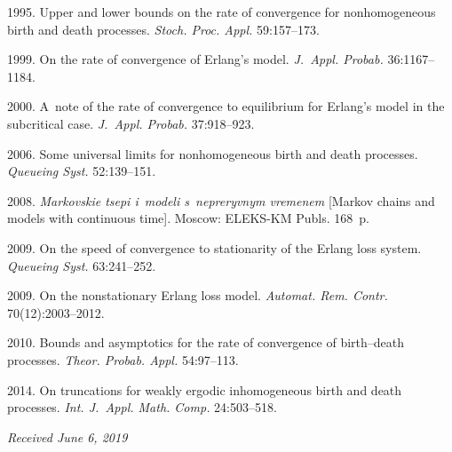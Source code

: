 \begin{multicols}{2}
{{\begin{thebibliography}{99}
 1995. Upper and lower bounds on the rate of convergence for nonhomogeneous 
 birth and death processes. 
  \textit{Stoch. Proc. Appl.} 59:157--173.
  
 1999. On the rate of convergence of Erlang's model.
 \textit{J.~Appl. Probab.} 36:1167--1184.
  
 2000. 
A~note of the rate of convergence to equilibrium for Erlang's model 
in the subcritical case. \textit{J.~Appl. Probab.} 37:918--923.

2006. Some universal limits for nonhomogeneous birth and death processes. 
 \textit{Queueing Syst.} 52:139--151.
 
 2008.  \textit{Markovskie tsepi i~modeli s~nepreryvnym vremenem} 
 [Markov chains and models with continuous time]. Moscow: ELEKS-KM Publs. 168~p.
 
2009. On the speed of convergence to stationarity of the Erlang loss system. 
\textit{Queueing Syst.} 63:241--252.

 2009. On the nonstationary Erlang loss model.
  \textit{Automat. Rem. Contr.} 70(12):2003--2012.
  
 2010. Bounds and asymptotics for the rate of convergence of birth--death processes. 
 \textit{Theor. Probab.  Appl.} 54:97--113.
 
 2014. On truncations for weakly ergodic inhomogeneous birth and death processes. 
 \textit{Int. J.~Appl. Math. Comp.} 24:503--518.

\end{thebibliography}

 }
 }

\end{multicols}


\hfill{\small\textit{Received June 6, 2019}}



